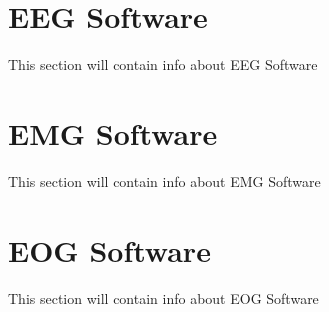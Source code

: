 \documentclass[a4paper,10pt,english,oneside]{sphinxmanual}
\begin{document}
\begin{DUlineblock}{0em}
\item[] 
\end{DUlineblock}


\section{EEG Software}
\label{\detokenize{software/index:eeg-software}}\label{\detokenize{software/index:open21}}
\sphinxAtStartPar
This section will contain info about EEG Software

\begin{DUlineblock}{0em}
\item[] 
\end{DUlineblock}


\section{EMG Software}
\label{\detokenize{software/index:emg-software}}\label{\detokenize{software/index:open22}}
\sphinxAtStartPar
This section will contain info about EMG Software

\begin{DUlineblock}{0em}
\item[] 
\end{DUlineblock}


\section{EOG Software}
\label{\detokenize{software/index:eog-software}}\label{\detokenize{software/index:open23}}
\sphinxAtStartPar
This section will contain info about EOG Software

\begin{DUlineblock}{0em}
\item[] 
\end{DUlineblock}

\sphinxstepscope
\end{document}
